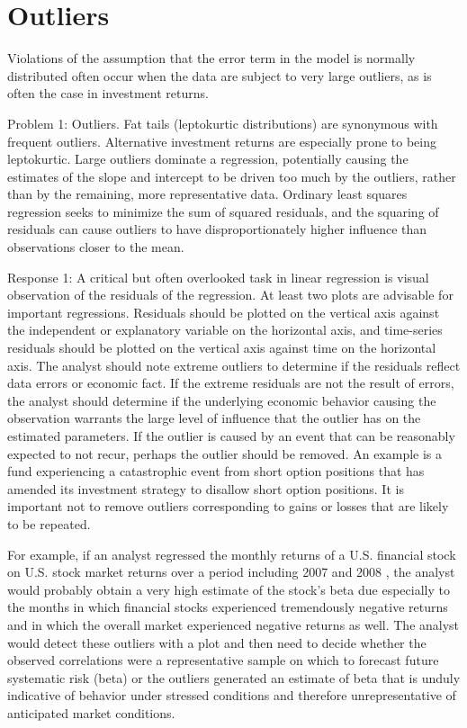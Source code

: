 \documentclass[11pt]{article}
\begin{document}
\section*{Outliers}
Violations of the assumption that the error term in the model is normally distributed often occur when the data are subject to very large outliers, as is often the case in investment returns.

Problem 1: Outliers. Fat tails (leptokurtic distributions) are synonymous with frequent outliers. Alternative investment returns are especially prone to being leptokurtic. Large outliers dominate a regression, potentially causing the estimates of the slope and intercept to be driven too much by the outliers, rather than by the remaining, more representative data. Ordinary least squares regression seeks to minimize the sum of squared residuals, and the squaring of residuals can cause outliers to have disproportionately higher influence than observations closer to the mean.

Response 1: A critical but often overlooked task in linear regression is visual observation of the residuals of the regression. At least two plots are advisable for important regressions. Residuals should be plotted on the vertical axis against the independent or explanatory variable on the horizontal axis, and time-series residuals should be plotted on the vertical axis against time on the horizontal axis. The analyst should note extreme outliers to determine if the residuals reflect data errors or economic fact. If the extreme residuals are not the result of errors, the analyst should determine if the underlying economic behavior causing the observation warrants the large level of influence that the outlier has on the estimated parameters. If the outlier is caused by an event that can be reasonably expected to not recur, perhaps the outlier should be removed. An example is a fund experiencing a catastrophic event from short option positions that has amended its investment strategy to disallow short option positions. It is important not to remove outliers corresponding to gains or losses that are likely to be repeated.

For example, if an analyst regressed the monthly returns of a U.S. financial stock on U.S. stock market returns over a period including 2007 and 2008 , the analyst would probably obtain a very high estimate of the stock's beta due especially to the months in which financial stocks experienced tremendously negative returns and in which the overall market experienced negative returns as well. The analyst would detect these outliers with a plot and then need to decide whether the observed correlations were a representative sample on which to forecast future systematic risk (beta) or the outliers generated an estimate of beta that is unduly indicative of behavior under stressed conditions and therefore unrepresentative of anticipated market conditions.
\end{document}

